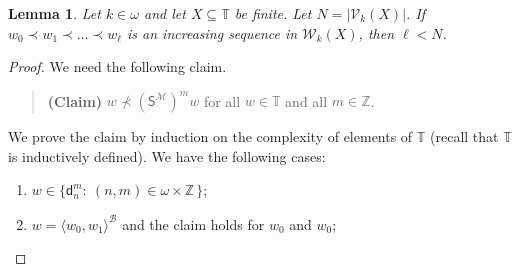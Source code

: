 \documentclass[10pt,a4paper, openany,  oldfontcommands]{memoir}
\newtheorem{lemma} [theorem] {Lemma}
\newtheorem{open problem} [theorem] {Open Problem}
\newtheorem{open question} [theorem] {Open Question}
\renewcommand{\mathrm}{\mathsf}
\begin{document}
\begin{lemma}  \label{SectionQWellFoundednessLemma}
Let   $ k \in  \omega  $  and let  $  X  \subseteq  \mathbb{T} $  be finite. 
Let  $ N  =  \vert     \mathcal{V}_k     \left(  X \right)   \vert  $. 
If  $  w_0  \prec  w_1  \prec     \ldots   \prec  w_ {\ell }  $  is an  increasing sequence in   $  \mathcal{W}_k     \left(  X \right)     $, 
then $  \ell  <  N  $.
\end{lemma}
\begin{proof}


We need the following claim. 

  \begin{quote} {\bf (Claim)} \;\;\;\;\;\;    
 $  w  \not\prec      \left(  \mathrm{S}^{  \mathcal{M} }  \right)^m  w   $
 for all  $  w  \in  \mathbb{T}  $  and all   $  m  \in  \mathbb{Z} $. 
 \end{quote}  

We prove the claim by induction on the  complexity of elements of  $  \mathbb{T} $
(recall that   $  \mathbb{T} $  is inductively defined). 
We have the following cases: 
\begin{enumerate}
\item   $  w  \in  \lbrace   \mathsf{d}^m_n  :   \   (n, m )  \in  \omega  \times   \mathbb{Z}  \,  \rbrace $; 

\item     $  w  =  \langle  w_0,  w_1  \rangle^{  \mathcal{B} }  $  and the claim holds for  $  w_0$  and $ w_0  $;  



\end{enumerate}
\end{proof}
\end{document}
